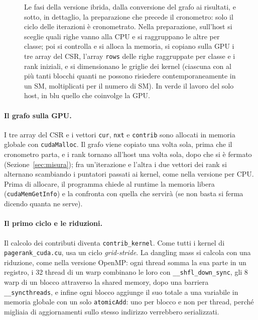\documentclass[11pt,a4paper]{article}
\begin{document}
\begin{figure}[htbp]
\caption{Le fasi della versione ibrida, dalla conversione del grafo ai
risultati, e sotto, in dettaglio, la preparazione che precede il cronometro:
solo il ciclo delle iterazioni è cronometrato. Nella preparazione, sull'host
si sceglie quali righe vanno alla CPU e si raggruppano le altre per classe;
poi si controlla e si alloca la memoria, si copiano sulla GPU i tre array del
CSR, l'array \texttt{rows} delle righe raggruppate per classe e i rank
iniziali, e si dimensionano le griglie dei kernel (ciascuna con al più tanti
blocchi quanti ne possono risiedere contemporaneamente in un SM, moltiplicati
per il numero di SM). In verde il lavoro del solo host, in blu quello che
coinvolge la GPU.}
\label{fig:panoramica}
\end{figure}

\paragraph{Il grafo sulla GPU.}
I tre array del CSR e i vettori \texttt{cur}, \texttt{nxt} e
\texttt{contrib} sono allocati in memoria globale con \texttt{cudaMalloc}. Il
grafo viene copiato una volta sola, prima che il cronometro parta, e i rank
tornano all'host una volta sola, dopo che si è fermato
(Sezione~\ref{sec:misura}); fra un'iterazione e l'altra i due vettori dei rank
si alternano scambiando i puntatori passati ai kernel, come nella versione per
CPU. Prima di allocare, il programma chiede al runtime la memoria libera
(\texttt{cudaMemGetInfo}) e la confronta con quella che servirà (se non basta
si ferma dicendo quanta ne serve).

\paragraph{Il primo ciclo e le riduzioni.}
Il calcolo dei contributi diventa \texttt{contrib\_kernel}. Come tutti i kernel di
\texttt{pagerank\_cuda.cu}, usa un ciclo \emph{grid-stride}. La dangling mass
si calcola con una riduzione, come nella versione OpenMP: ogni thread somma la sua parte in un registro, i 32
thread di un warp combinano le loro con \texttt{\_\_shfl\_down\_sync}, gli 8
warp di un blocco attraverso la shared memory, dopo una barriera
\texttt{\_\_syncthreads}, e infine ogni blocco aggiunge il suo totale a una
variabile in memoria globale con un solo \texttt{atomicAdd}: uno per blocco e
non per thread, perché migliaia di aggiornamenti sullo stesso indirizzo
verrebbero serializzati.
\end{document}
